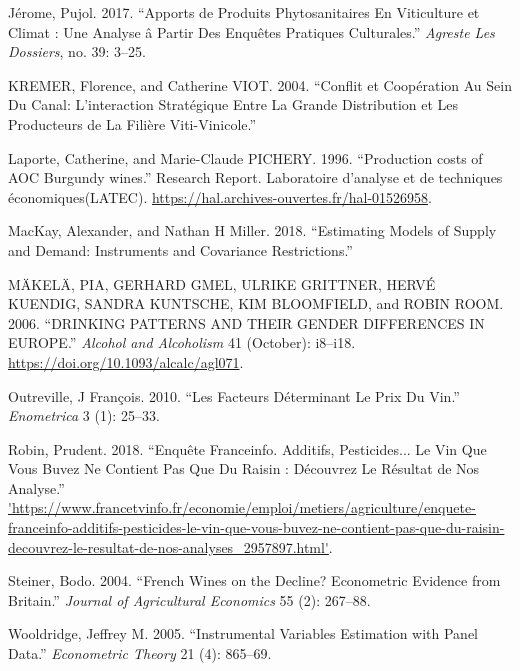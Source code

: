 \documentclass[11pt,]{article}
\begin{document}
\leavevmode\hypertarget{ref-Pujol2017}{}%
Jérome, Pujol. 2017. ``Apports de Produits Phytosanitaires En
Viticulture et Climat : Une Analyse â Partir Des Enquêtes Pratiques
Culturales.'' \emph{Agreste Les Dossiers}, no. 39: 3--25.

\leavevmode\hypertarget{ref-kremer2004}{}%
KREMER, Florence, and Catherine VIOT. 2004. ``Conflit et Coopération Au
Sein Du Canal: L'interaction Stratégique Entre La Grande Distribution et
Les Producteurs de La Filière Viti-Vinicole.''

\leavevmode\hypertarget{ref-laporte1996}{}%
Laporte, Catherine, and Marie-Claude PICHERY. 1996. ``Production costs
of AOC Burgundy wines.'' Research Report. Laboratoire d'analyse et de
techniques économiques(LATEC).
\url{https://hal.archives-ouvertes.fr/hal-01526958}.

\leavevmode\hypertarget{ref-mackay2018}{}%
MacKay, Alexander, and Nathan H Miller. 2018. ``Estimating Models of
Supply and Demand: Instruments and Covariance Restrictions.''

\leavevmode\hypertarget{ref-makela2006}{}%
MÄKELÄ, PIA, GERHARD GMEL, ULRIKE GRITTNER, HERVÉ KUENDIG, SANDRA
KUNTSCHE, KIM BLOOMFIELD, and ROBIN ROOM. 2006. ``DRINKING PATTERNS AND
THEIR GENDER DIFFERENCES IN EUROPE.'' \emph{Alcohol and Alcoholism} 41
(October): i8--i18. \url{https://doi.org/10.1093/alcalc/agl071}.

\leavevmode\hypertarget{ref-outreville2010}{}%
Outreville, J François. 2010. ``Les Facteurs Déterminant Le Prix Du
Vin.'' \emph{Enometrica} 3 (1): 25--33.

\leavevmode\hypertarget{ref-Prudent2018}{}%
Robin, Prudent. 2018. ``Enquête Franceinfo. Additifs, Pesticides... Le
Vin Que Vous Buvez Ne Contient Pas Que Du Raisin : Découvrez Le Résultat
de Nos Analyse.''
\url{'https://www.francetvinfo.fr/economie/emploi/metiers/agriculture/enquete-franceinfo-additifs-pesticides-le-vin-que-vous-buvez-ne-contient-pas-que-du-raisin-decouvrez-le-resultat-de-nos-analyses_2957897.html'}.

\leavevmode\hypertarget{ref-steiner2004}{}%
Steiner, Bodo. 2004. ``French Wines on the Decline? Econometric Evidence
from Britain.'' \emph{Journal of Agricultural Economics} 55 (2):
267--88.

\leavevmode\hypertarget{ref-wooldridge2005instrumental}{}%
Wooldridge, Jeffrey M. 2005. ``Instrumental Variables Estimation with
Panel Data.'' \emph{Econometric Theory} 21 (4): 865--69.
\end{document}
